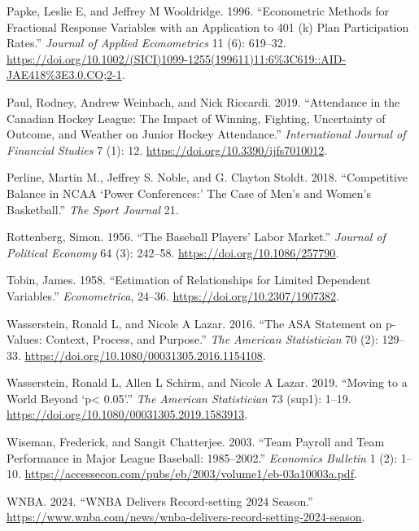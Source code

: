 \documentclass[
  letterpaper,
  DIV=11,
  numbers=noendperiod]{scrartcl}
\newlength{\cslhangindent}
\newenvironment{CSLReferences}[2] %
 {\begin{list}{}{%
  \setlength{\itemindent}{0pt}
  \setlength{\leftmargin}{0pt}
  \setlength{\parsep}{0pt}
  \ifodd #1
   \setlength{\leftmargin}{\cslhangindent}
   \setlength{\itemindent}{-1\cslhangindent}
  \fi
  \setlength{\itemsep}{#2\baselineskip}}}
 {\end{list}}
\begin{document}
\begin{CSLReferences}{1}{1}
Papke, Leslie E, and Jeffrey M Wooldridge. 1996. {``Econometric Methods
for Fractional Response Variables with an Application to 401 (k) Plan
Participation Rates.''} \emph{Journal of Applied Econometrics} 11 (6):
619--32.
\url{https://doi.org/10.1002/(SICI)1099-1255(199611)11:6\%3C619::AID-JAE418\%3E3.0.CO;2-1}.

Paul, Rodney, Andrew Weinbach, and Nick Riccardi. 2019. {``Attendance in
the Canadian Hockey League: The Impact of Winning, Fighting, Uncertainty
of Outcome, and Weather on Junior Hockey Attendance.''}
\emph{International Journal of Financial Studies} 7 (1): 12.
\url{https://doi.org/10.3390/ijfs7010012}.

Perline, Martin M., Jeffrey S. Noble, and G. Clayton Stoldt. 2018.
{``Competitive Balance in NCAA {`Power Conferences:'} The Case of Men's
and Women's Basketball.''} \emph{The Sport Journal} 21.

Rottenberg, Simon. 1956. {``The Baseball Players' Labor Market.''}
\emph{Journal of Political Economy} 64 (3): 242--58.
\url{https://doi.org/10.1086/257790}.

Tobin, James. 1958. {``Estimation of Relationships for Limited Dependent
Variables.''} \emph{Econometrica}, 24--36.
\url{https://doi.org/10.2307/1907382}.

Wasserstein, Ronald L, and Nicole A Lazar. 2016. {``The ASA Statement on
p-Values: Context, Process, and Purpose.''} \emph{The American
Statistician} 70 (2): 129--33.
\url{https://doi.org/10.1080/00031305.2016.1154108}.

Wasserstein, Ronald L, Allen L Schirm, and Nicole A Lazar. 2019.
{``Moving to a World Beyond {`p\textless{} 0.05'}.''} \emph{The American
Statistician} 73 (sup1): 1--19.
\url{https://doi.org/10.1080/00031305.2019.1583913}.

Wiseman, Frederick, and Sangit Chatterjee. 2003. {``Team Payroll and
Team Performance in Major League Baseball: 1985--2002.''}
\emph{Economics Bulletin} 1 (2): 1--10.
\url{https://accessecon.com/pubs/eb/2003/volume1/eb-03a10003a.pdf}.

WNBA. 2024. {``WNBA Delivers Record‑setting 2024 Season.''}
\url{https://www.wnba.com/news/wnba-delivers-record-setting-2024-season}.


\end{CSLReferences}
\end{document}
